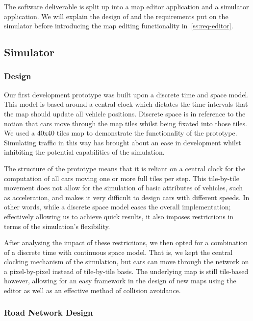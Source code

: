 The software deliverable is split up into a map editor application and a simulator application. We will explain the design of and the requirements put on the simulator before introducing the map editing functionality in~\ref{ss:req-editor}.

\subsection{Simulator}
\subsubsection{Design}

Our first development prototype was built upon a discrete time and space model. This model is based around a central clock which dictates the time intervals that the map should update all vehicle positions. Discrete space is in reference to the notion that cars move through the map tiles whilst being fixated into those tiles. We used a 40x40 tiles map to demonstrate the functionality of the prototype. Simulating traffic in this way has brought about an ease in development whilst inhibiting the potential capabilities of the simulation.

The structure of the prototype means that it is reliant on a central clock for the computation of all cars moving one or more full tiles per step. This tile-by-tile movement does not allow for the simulation of basic attributes of vehicles, such as acceleration, and makes it very difficult to design cars with different speeds. In other words, while a discrete space model eases the overall implementation; effectively allowing us to achieve quick results, it also imposes restrictions in terms of the simulation's flexibility.

After analysing the impact of these restrictions, we then opted for a combination of a discrete time with continuous space model. That is, we kept the central clocking mechanism of the simulation, but cars can move through the network on a pixel-by-pixel instead of tile-by-tile basis. The underlying map is still tile-based however, allowing for an easy framework in the design of new maps using the editor as well as an effective method of collision avoidance.

\subsubsection*{Road Network Design}

